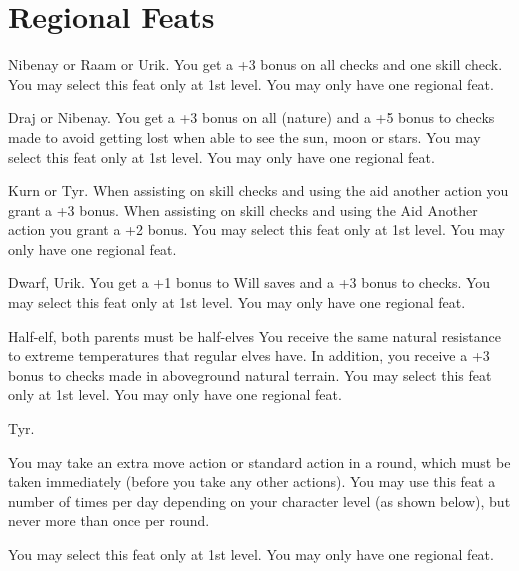 \section{Regional Feats}

{}
{Nibenay or Raam or Urik.}
{You get a +3 bonus on all  checks and one  skill check.}
{}
{You may select this feat only at 1st level. You may only have one regional feat.}

{}
{Draj or Nibenay.}
{You get a +3 bonus on all  (nature) and a +5 bonus to  checks made to avoid getting lost when able to see the sun, moon or stars.}
{}
{You may select this feat only at 1st level. You may only have one regional feat.}

{}
{Kurn or Tyr.}
{When assisting on skill checks and using the aid another action you grant a +3 bonus.}
{When assisting on skill checks and using the Aid Another action you grant a +2 bonus.}
{You may select this feat only at 1st level. You may only have one regional feat.}

{}
{Dwarf, Urik.}
{You get a +1 bonus to Will saves and a +3 bonus to  checks.}
{}
{You may select this feat only at 1st level. You may only have one regional feat.}

{}
{Half-elf, both parents must be half-elves}
{You receive the same natural resistance to extreme temperatures that regular elves have. In addition, you receive a +3 bonus to  checks made in aboveground natural terrain.}
{}
{You may select this feat only at 1st level. You may only have one regional feat.}

{}
{Tyr.}
{You may take an extra move action or standard action in a round, which must be taken immediately (before you take any other actions). You may use this feat a number of times per day depending on your character level (as shown below), but never more than once per round.

}
{}
{You may select this feat only at 1st level. You may only have one regional feat.}

